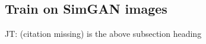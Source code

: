 \documentclass[10pt,twocolumn,letterpaper]{article}
\newcommand{\tompson}[1]{{\color{green} JT: #1}}
\begin{document}
\subsection{Train on SimGAN images}
\tompson{(citation missing) is the above subsection heading}

\end{document}
